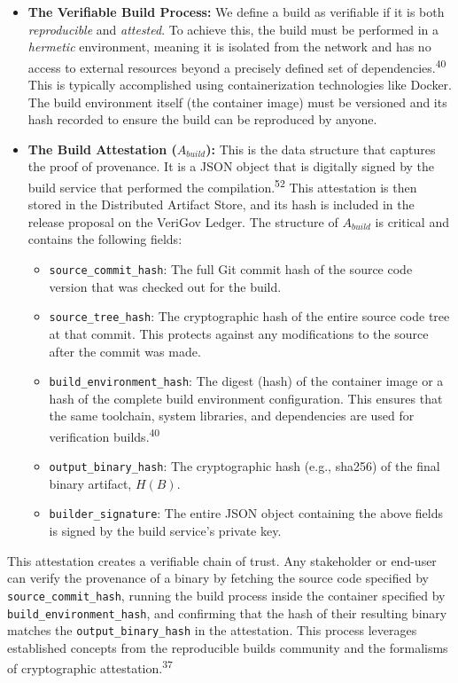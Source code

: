 \documentclass{article}
\begin{document}
\begin{itemize}
\item \textbf{The Verifiable Build Process:} We define a build as verifiable if it is both \emph{reproducible} and \emph{attested}. To achieve this, the build must be performed in a \emph{hermetic} environment, meaning it is isolated from the network and has no access to external resources beyond a precisely defined set of dependencies.\textsuperscript{40} This is typically accomplished using containerization technologies like Docker. The build environment itself (the container image) must be versioned and its hash recorded to ensure the build can be reproduced by anyone.
\item \textbf{The Build Attestation (}$A_{build}$\textbf{):} This is the data structure that captures the proof of provenance. It is a JSON object that is digitally signed by the build service that performed the compilation.\textsuperscript{52} This attestation is then stored in the Distributed Artifact Store, and its hash is included in the release proposal on the VeriGov Ledger. The structure of $A_{build}$ is critical and contains the following fields:
\begin{itemize}
\item \lstinline{source_commit_hash}: The full Git commit hash of the source code version that was checked out for the build.
\item \lstinline{source_tree_hash}: The cryptographic hash of the entire source code tree at that commit. This protects against any modifications to the source after the commit was made.
\item \lstinline{build_environment_hash}: The digest (hash) of the container image or a hash of the complete build environment configuration. This ensures that the same toolchain, system libraries, and dependencies are used for verification builds.\textsuperscript{40}
\item \lstinline{output_binary_hash}: The cryptographic hash (e.g., sha256) of the final binary artifact, $H(B)$.
\item \lstinline{builder_signature}: The entire JSON object containing the above fields is signed by the build service's private key.
\end{itemize}
\end{itemize}

This attestation creates a verifiable chain of trust. Any stakeholder or end-user can verify the provenance of a binary by fetching the source code specified by \lstinline{source_commit_hash}, running the build process inside the container specified by \lstinline{build_environment_hash}, and confirming that the hash of their resulting binary matches the \lstinline{output_binary_hash} in the attestation. This process leverages established concepts from the reproducible builds community and the formalisms of cryptographic attestation.\textsuperscript{37}
\end{document}
